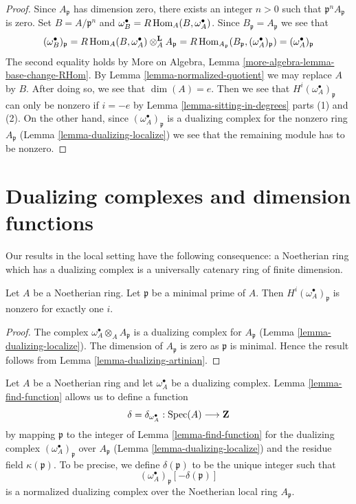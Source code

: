 \begin{proof}
Since $A_\mathfrak p$ has dimension zero, there exists an integer
$n > 0$ such that $\mathfrak p^nA_\mathfrak p$ is zero.
Set $B = A/\mathfrak p^n$ and
$\omega_B^\bullet = R\mathop{\mathrm{Hom}}\nolimits_A(B, \omega_A^\bullet)$.
Since $B_\mathfrak p = A_\mathfrak p$ we see that
$$
(\omega_B^\bullet)_\mathfrak p =
R\mathop{\mathrm{Hom}}\nolimits_A(B, \omega_A^\bullet) \otimes_A^\mathbf{L} A_\mathfrak p =
R\mathop{\mathrm{Hom}}\nolimits_{A_\mathfrak p}(B_\mathfrak p, (\omega_A^\bullet)_\mathfrak p) =
(\omega_A^\bullet)_\mathfrak p
$$
The second equality holds by
More on Algebra, Lemma \ref{more-algebra-lemma-base-change-RHom}.
By Lemma \ref{lemma-normalized-quotient} we may replace $A$ by $B$.
After doing so, we see that $\dim(A) = e$. Then we see that
$H^i(\omega_A^\bullet)_\mathfrak p$ can only be nonzero if $i = -e$
by Lemma \ref{lemma-sitting-in-degrees} parts (1) and (2).
On the other hand, since $(\omega_A^\bullet)_\mathfrak p$
is a dualizing complex for the nonzero ring $A_\mathfrak p$
(Lemma \ref{lemma-dualizing-localize})
we see that the remaining module has to be nonzero.
\end{proof}





\section{Dualizing complexes and dimension functions}
\label{section-dimension-function}

\noindent
Our results in the local setting have the following consequence:
a Noetherian ring which has a dualizing complex is a
universally catenary ring of finite dimension.

\begin{lemma}
\label{lemma-nonvanishing-generically}
Let $A$ be a Noetherian ring. Let $\mathfrak p$ be a minimal prime
of $A$. Then $H^i(\omega_A^\bullet)_\mathfrak p$ is nonzero
for exactly one $i$.
\end{lemma}

\begin{proof}
The complex $\omega_A^\bullet \otimes_A A_\mathfrak p$
is a dualizing complex for $A_\mathfrak p$
(Lemma \ref{lemma-dualizing-localize}).
The dimension of $A_\mathfrak p$ is zero as $\mathfrak p$
is minimal. Hence the result follows from
Lemma \ref{lemma-dualizing-artinian}.
\end{proof}

\noindent
Let $A$ be a Noetherian ring and let $\omega_A^\bullet$ be a dualizing
complex. Lemma \ref{lemma-find-function} allows us to define a function
$$
\delta = \delta_{\omega_A^\bullet} : \mathop{\mathrm{Spec}}(A) \longrightarrow \mathbf{Z}
$$
by mapping $\mathfrak p$ to the integer of Lemma \ref{lemma-find-function}
for the dualizing complex $(\omega_A^\bullet)_\mathfrak p$
over $A_\mathfrak p$ (Lemma \ref{lemma-dualizing-localize})
and the residue field $\kappa(\mathfrak p)$. To be precise, we define
$\delta(\mathfrak p)$ to be the unique integer such that
$$
(\omega_A^\bullet)_\mathfrak p[-\delta(\mathfrak p)]
$$
is a normalized dualizing complex over the Noetherian local ring
$A_\mathfrak p$.

